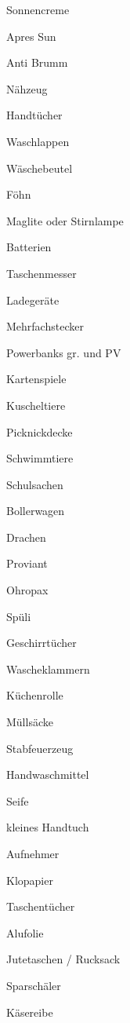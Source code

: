 

\begin{ONEitemize}
    \item{Sonnencreme}
    \item{Apres Sun}
    \item{Anti Brumm}
    \item{Nähzeug}
    \item{Handtücher}
    \item{Waschlappen}
    \item{Wäschebeutel}
    \item{Föhn}
    \item{Maglite oder Stirnlampe}
    \item{Batterien}
    \item{Taschenmesser}
    \item{Ladegeräte}
    \item{Mehrfachstecker}
    \item{Powerbanks gr. und PV}
    \item{Kartenspiele}
    \item{Kuscheltiere}
    \item{Picknickdecke}
    \item{Schwimmtiere}
    \item{Schulsachen}
    \item{Bollerwagen}
    \item{Drachen}
    \item{Proviant}
    \item{Ohropax}
    \item{Spüli}
    \item{Geschirrtücher}
    \item{Wascheklammern}
    \item{Küchenrolle}
    \item{Müllsäcke}
    \item{Stabfeuerzeug}
    \item{Handwaschmittel}
     \item{Seife}
    \item{kleines Handtuch}
    \item{Aufnehmer}
    \item{Klopapier}
    \item{Taschentücher}
    \item{Alufolie}
    \item{Jutetaschen / Rucksack}
    \item{Sparschäler}
    \item{Käsereibe}


\end{ONEitemize}
